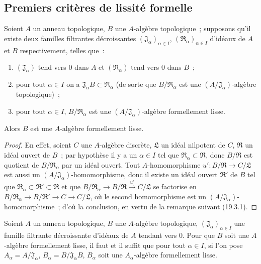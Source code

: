 \subsection{Premiers critères de lissité formelle}
\label{subsection:0.19.4-fr}

\begin{proposition}[19.4.1]
\label{0.19.4.1-fr}
Soient $A$ un anneau topologique, $B$ une $A$-algèbre topologique~; supposons
qu'il existe deux familles filtrantes décroissantes
$(\mathfrak J_\alpha)_{\alpha\in I}$,
$(\mathfrak R_\alpha)_{\alpha\in I}$ d'idéaux de $A$ et $B$
respectivement, telles que~:
\begin{enumerate}
  \item[$1^\circ$] $(\mathfrak J_\alpha)$ tend vers $0$ dans $A$ et
  $(\mathfrak R_\alpha)$ tend vers $0$ dans $B$~;
  \item[$2^\circ$] pour tout $\alpha\in I$ on a
  $\mathfrak J_\alpha B\subset\mathfrak R_\alpha$ (de sorte que
  $B/\mathfrak R_\alpha$ est une
  $(A/\mathfrak J_\alpha)$-algèbre topologique)~;
  \item[$3^\circ$] pour tout $\alpha\in I$,
  $B/\mathfrak R_\alpha$ est une
  $(A/\mathfrak J_\alpha)$-algèbre formellement lisse.
\end{enumerate}
Alors $B$ est une $A$-algèbre formellement lisse.
\end{proposition}

\begin{proof}
En effet, soient $C$ une $A$-algèbre discrète, $\mathfrak L$ un idéal
nilpotent de $C$, $\mathfrak R$ un idéal ouvert de $B$~; par hypothèse il y a
un $\alpha\in I$ tel que
$\mathfrak R_\alpha\subset\mathfrak R$, donc $B/\mathfrak R$ est
quotient de $B/\mathfrak R_\alpha$ par un idéal ouvert. Tout
$A$-homomorphisme $u':B/\mathfrak R\to C/\mathfrak L$ est aussi un
$(A/\mathfrak J_\alpha)$-homomorphisme, donc il existe un idéal ouvert
$\mathfrak R'$ de $B$ tel que
$\mathfrak R_\alpha\subset\mathfrak R'\subset\mathfrak R$ et que
$B/\mathfrak R_\alpha\to B/\mathfrak R\xrightarrow{u'}C/\mathfrak L$
se factorise en
$B/\mathfrak R_\alpha\to B/\mathfrak R'\to C\to C/\mathfrak L$,
où le second homomorphisme est un
$(A/\mathfrak J_\alpha)$-homomorphisme~; d'où la conclusion, en vertu de
la remarque suivant (19.3.1).
\end{proof}

\begin{corollary}[19.4.2]
\label{0.19.4.2-fr}
Soient $A$ un anneau topologique, $B$ une $A$-algèbre topologique,
$(\mathfrak J_\alpha)_{\alpha\in I}$ une famille filtrante décroissante
d'idéaux de $A$ tendant vers $0$. Pour que $B$ soit une $A$-algèbre
formellement lisse, il faut et il suffit que pour tout $\alpha\in I$, si
l'on pose $A_\alpha=A/\mathfrak J_\alpha$,
$B_\alpha=B/\mathfrak J_\alpha B$, $B_\alpha$ soit une
$A_\alpha$-algèbre formellement lisse.
\end{corollary}

